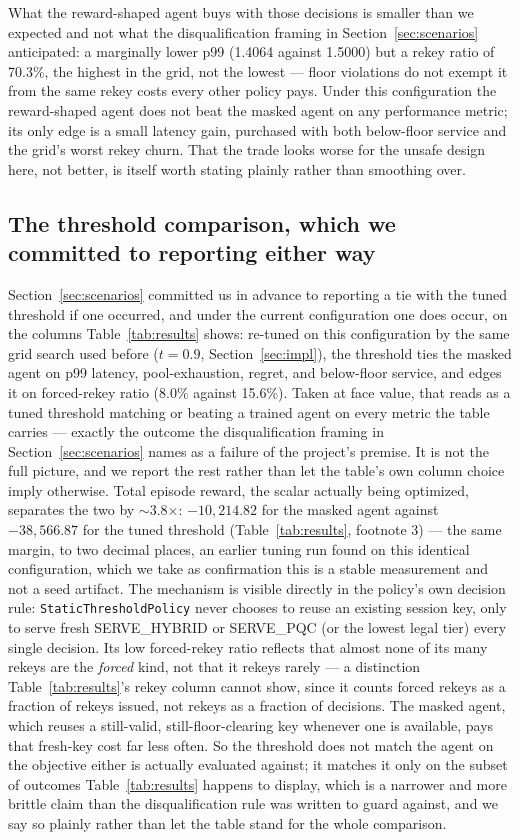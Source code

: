 \documentclass[conference]{IEEEtran}
\begin{document}
What the reward-shaped agent buys with those decisions is
smaller than we expected and not what the disqualification
framing in Section~\ref{sec:scenarios} anticipated: a marginally lower p99
(1.4064 against 1.5000) but a rekey ratio of 70.3\%, the highest
in the grid, not the lowest --- floor violations do not exempt it
from the same rekey costs every other policy pays. Under this
configuration the reward-shaped agent does not beat the masked
agent on any performance metric; its only edge is a small
latency gain, purchased with both below-floor service and the
grid's worst rekey churn. That the trade looks worse for the
unsafe design here, not better, is itself worth stating plainly
rather than smoothing over.

\subsection{The threshold comparison, which we committed to reporting either way}

Section~\ref{sec:scenarios} committed us in advance to reporting a tie
with the tuned threshold if one occurred, and under the current
configuration one does occur, on the columns Table~\ref{tab:results}
shows: re-tuned on this configuration by the same grid search used
before ($t=0.9$, Section~\ref{sec:impl}), the threshold ties the masked
agent on p99 latency, pool-exhaustion, regret, and below-floor
service, and edges it on forced-rekey ratio (8.0\% against
15.6\%). Taken at face value, that reads as a tuned threshold
matching or beating a trained agent on every metric the table
carries --- exactly the outcome the disqualification framing in
Section~\ref{sec:scenarios} names as a failure of the project's premise.
It is not the full picture, and we report the rest rather than let
the table's own column choice imply otherwise. Total episode reward,
the scalar actually being optimized, separates the two by
$\sim$3.8$\times$: $-10{,}214.82$ for the masked agent against
$-38{,}566.87$ for the tuned threshold (Table~\ref{tab:results},
footnote 3) --- the same margin, to two decimal places, an earlier
tuning run found on this identical configuration, which we take as
confirmation this is a stable measurement and not a seed artifact.
The mechanism is visible directly in the policy's own decision
rule: \texttt{StaticThresholdPolicy} never chooses to reuse an
existing session key, only to serve fresh SERVE\_HYBRID or SERVE\_PQC
(or the lowest legal tier) every single decision. Its low
forced-rekey ratio reflects that almost none of its many rekeys are
the \emph{forced} kind, not that it rekeys rarely --- a distinction
Table~\ref{tab:results}'s rekey column cannot show, since it counts
forced rekeys as a fraction of rekeys issued, not rekeys as a
fraction of decisions. The masked agent, which reuses a
still-valid, still-floor-clearing key whenever one is available,
pays that fresh-key cost far less often. So the threshold does not
match the agent on the objective either is actually evaluated
against; it matches it only on the subset of outcomes Table~\ref{tab:results}
happens to display, which is a narrower and more brittle claim than
the disqualification rule was written to guard against, and we say
so plainly rather than let the table stand for the whole comparison.
\end{document}
